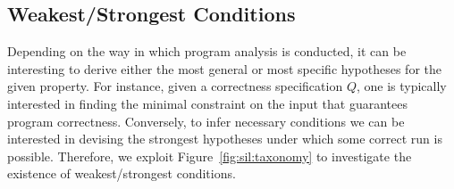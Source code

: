 
\subsection{Weakest/Strongest Conditions}
Depending on the way in which program analysis is conducted, it can be interesting to derive either the most general or most specific hypotheses for the given property.
For instance, given a correctness specification $Q$, one is typically interested in finding the minimal constraint on the input that guarantees program correctness.
Conversely, to infer necessary conditions we can be interested in devising the strongest hypotheses under which some correct run is possible.
Therefore, we exploit Figure~\ref{fig:sil:taxonomy} to investigate the existence of weakest/strongest conditions.


